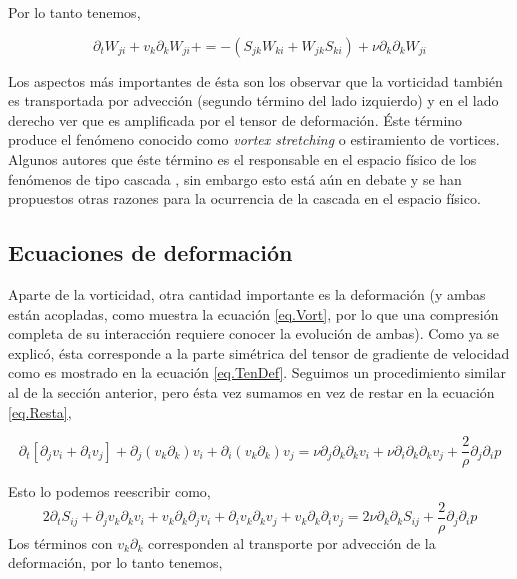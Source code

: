 \documentclass[executivepaper,12pt]{article}
\numberwithin{equation}{section}
\begin{document}
Por lo tanto tenemos, 

\begin{equation}
\partial_tW_{ji}+v_k\partial_kW_{ji}+=-(S_{jk}W_{ki}+W_{jk}S_{ki})+\nu\partial_k\partial_k W_{ji} \label{eq.Vort}
\end{equation}

Los aspectos más importantes de ésta son los  observar que la vorticidad también es transportada por advección (segundo término del lado izquierdo) y en el lado derecho ver que es amplificada por el tensor de deformación. Éste término produce el fenómeno conocido como \textit{vortex stretching} o estiramiento de vortices. Algunos autores que éste término es el responsable en el espacio físico de los fenómenos de tipo cascada \parencite{goto2008}, sin embargo esto está aún en debate y se han propuestos otras razones para la ocurrencia de la cascada en el espacio físico. 

\subsection{Ecuaciones de deformación}

Aparte de la vorticidad, otra cantidad importante es la deformación (y ambas están acopladas, como muestra la ecuación \ref{eq.Vort}, por lo que una compresión completa de su interacción requiere conocer la evolución de ambas). Como ya se explicó, ésta corresponde a la parte simétrica del tensor de gradiente de velocidad como es mostrado en la ecuación \ref{eq.TenDef}. Seguimos un procedimiento similar al de la sección anterior, pero ésta vez sumamos en vez de restar en la ecuación \ref{eq.Resta},

\begin{equation*}
\partial_t\left[\partial_j v_i+\partial_i v_j\right] +\partial_j(v_k\partial_k)v_i+\partial_i(v_k\partial_k)v_j=\nu\partial_j\partial_k\partial_k v_i+\nu\partial_i\partial_k\partial_k v_j+\frac{2}{\rho}\partial_j\partial_i p
\end{equation*}

Esto lo podemos reescribir como, 
\begin{equation*}
	2\partial_tS_{ij} +\partial_jv_k\partial_kv_i +v_k\partial_k\partial_jv_i+\partial_iv_k\partial_kv_j+v_k\partial_k\partial_iv_j=2\nu\partial_k\partial_kS_{ij}+\frac{2}{\rho}\partial_j\partial_i p
\end{equation*}
Los términos con $v_k\partial_k$ corresponden al transporte por advección de la deformación, por lo tanto tenemos,
\end{document}
